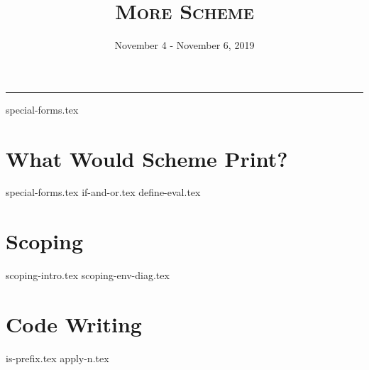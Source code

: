 \documentclass{exam}
\title{\textsc{More Scheme}}
\date{November 4 - November 6, 2019}
\begin{document}
\maketitle
\rule{\textwidth}{0.15em}
\fontsize{12}{15}\selectfont

{special-forms.tex}
\begin{questions}
\section{What Would Scheme Print?}
{special-forms.tex}
{if-and-or.tex}
{define-eval.tex}


\section{Scoping}
{scoping-intro.tex}
{scoping-env-diag.tex}


\section{Code Writing}
{is-prefix.tex}
{apply-n.tex}

\end{questions}
\end{document}
